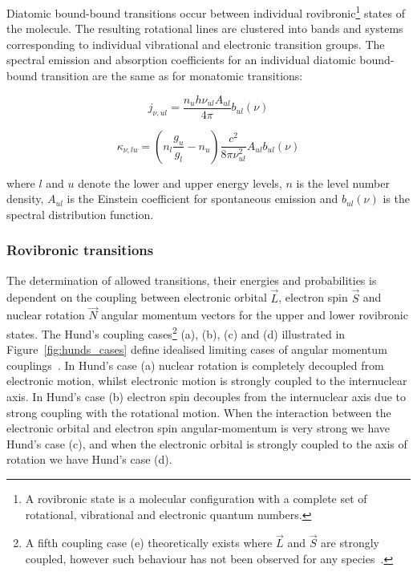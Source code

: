 Diatomic bound-bound transitions occur between individual rovibronic\footnote{A rovibronic state is a molecular configuration with a complete set of rotational, vibrational and electronic quantum numbers.} states of the molecule.
The resulting rotational lines are clustered into bands and systems corresponding to individual vibrational and electronic transition groups.
The spectral emission and absorption coefficients for an individual diatomic bound-bound transition are the same as for monatomic transitions:

\begin{equation}
 j_{\nu,ul} = \frac{n_{u} h \nu_{u l} A_{u l}}{4 \pi} b_{ul}(\nu) \label{eq:diatomic_j_nu_ul}
\end{equation}

\begin{equation}
 \kappa_{\nu,lu} = \left ( n_l \frac{g_u}{g_l} - n_u \right ) \frac{c^2}{8 \pi \nu_{ul}^2} A_{ul} b_{ul}(\nu) \label{eq:diatomic_kappa_nu_lu}
\end{equation}

\noindent where $l$ and $u$ denote the lower and upper energy levels, $n$ is the level number density, $A_{ul}$ is the Einstein coefficient for spontaneous emission and $b_{ul}(\nu)$ is the spectral distribution function.


\subsubsection{Rovibronic transitions}

The determination of allowed transitions, their energies and probabilities is dependent on the coupling between electronic orbital $\vec{L}$, electron spin $\vec{S}$ and nuclear rotation $\vec{N}$ angular momentum vectors for the upper and lower rovibronic states.
The Hund's coupling cases\footnote{A fifth coupling case (e) theoretically exists where $\vec{L}$ and $\vec{S}$ are strongly coupled, however such behaviour has not been observed for any species~\cite{HH_1979}.} (a), (b), (c) and (d) illustrated in Figure~\ref{fig:hunds_cases} define idealised limiting cases of angular momentum couplings~\cite{HH_1979}. 
In Hund's case (a) nuclear rotation is completely decoupled from electronic motion, whilst electronic motion is strongly coupled to the internuclear axis.
In Hund's case (b) electron spin decouples from the internuclear axis due to strong coupling with the rotational motion.
When the interaction between the electronic orbital and electron spin angular-momentum is very strong we have Hund's case (c), and when the electronic orbital is strongly coupled to the axis of rotation we have Hund's case (d).

